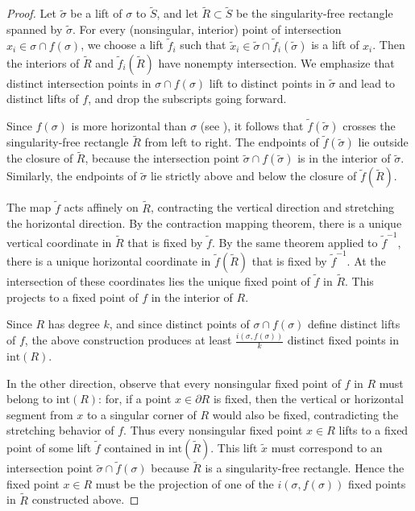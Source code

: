 \documentclass[11pt,letterpaper]{amsart}
\newcommand{\wt}{\widetilde}
\newcommand{\bdy}{\partial} %
\numberwithin{equation}{section}
\theoremstyle{definition}
\renewcommand{\int}{\mathrm{int}}
\begin{document}
\begin{proof}
Let $\wt \sigma$ be a lift of $\sigma$ to $\wt S$, and let $\wt R \subset \wt S$ be the singularity-free rectangle spanned by $\wt \sigma$.
For every (nonsingular, interior) point of intersection $x_i \in \sigma \cap f(\sigma)$, we choose a lift $\wt f_i$ such that $\wt x_i \in \wt \sigma \cap \wt f_i(\wt \sigma)$ is a lift of $x_i$. Then 
the interiors of $\wt R$ and $\wt f_i(\wt R)$ have nonempty intersection.
We emphasize that distinct intersection points in $\sigma \cap f(\sigma)$ lift to distinct points in $\wt \sigma$ and lead to distinct lifts of $f$, and drop the subscripts going forward.

Since $f(\sigma)$ is more horizontal than $\sigma$ (see ), it follows that $\wt f(\wt \sigma)$ crosses the singularity-free rectangle $\wt R$ from left to right. The endpoints of $\wt f(\wt \sigma)$ lie outside the closure of $\wt R$, because the intersection point $\wt \sigma \cap f(\wt \sigma)$ is in the interior of $\wt \sigma$. Similarly, the endpoints of $\wt \sigma$ lie strictly above and below the closure of $\wt f(
\wt R)$.

The map $\wt f$ acts affinely on $\wt R$, contracting the vertical direction and stretching the horizontal direction. By the contraction mapping theorem, there is a unique vertical coordinate in $\wt R$ that is fixed by $\wt f$. By the same theorem applied to $\wt f^{-1}$, there is a unique horizontal coordinate in $\wt f(\wt R)$ that is fixed by $\wt f^{-1}$. At the intersection of these coordinates lies the  unique fixed point of $\wt f$ in $\wt R$. This projects to a fixed point of $f$ in the interior of $R$. 

Since $R$ has degree $k$, and since distinct points of $\sigma \cap f(\sigma)$ define distinct lifts of $f$, the above construction produces at least $\frac{i(\sigma, f(\sigma))}{k}$ distinct fixed points in $\int(R)$. 

In the other direction, observe that every nonsingular fixed point of $f$ in $R$ must belong to $\int(R)$: for, if a point $x \in \bdy R$ is fixed, then the vertical or horizontal segment from $x$ to a singular corner of $R$ would also be fixed, contradicting the stretching behavior of $f$.
Thus every nonsingular fixed point  $x \in R$ lifts to a fixed point  of some lift $\wt f$ contained in $\int(\wt R)$. This lift  $\wt x$ must correspond to an intersection point $\wt \sigma \cap \wt f(\sigma)$ because $\wt R$ is a singularity-free rectangle. Hence the fixed point  $x \in R$ must be the projection of one of the $ i(\sigma, f(\sigma))$ fixed points in $\wt R$ constructed above.
\end{proof}
 
\end{document}
